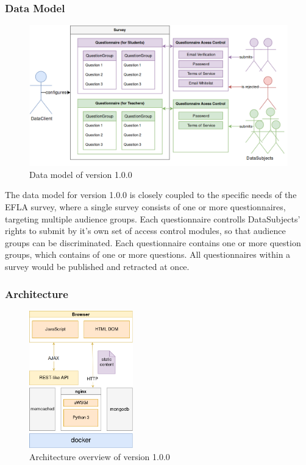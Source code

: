 \documentclass[a4paper,11pt]{article}
\begin{document}
           \subsubsection{Data Model}

           \begin{figure}[H]
                \centering
                \includegraphics[width=\textwidth]{v1-model}
                \caption{Data model of version 1.0.0}
                \label{fig:v1-data-model}
            \end{figure}

            The data model for version 1.0.0 is closely coupled to the specific needs of the
            EFLA survey, where a single survey consists of one or more questionnaires, targeting
            multiple audience groups.
            Each questionnaire controlls DataSubjects' rights to submit by it's own set of access 
            control modules, so that audience groups can be discriminated.
            Each questionnaire contains one or more question groups, which contains of
            one or more questions.
            All questionnaires within a survey would be published and retracted at once.

            \subsubsection{Architecture}

            \begin{figure}
                \centering
                \includegraphics[width=0.4\textwidth]{v1-stack}
                \caption{Architecture overview of version 1.0.0}
                \label{fig:v1-stack}
            \end{figure}
\end{document}
